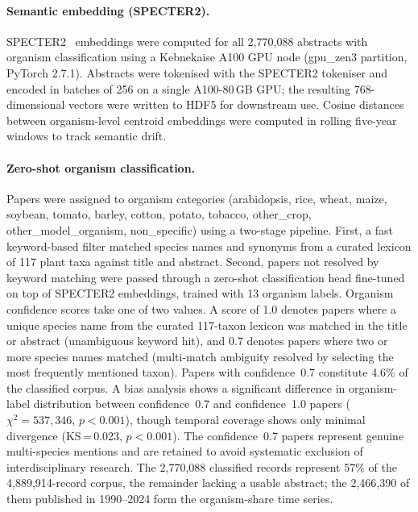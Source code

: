 \paragraph{Semantic embedding (SPECTER2).}
SPECTER2~\cite{singh2023specter2} embeddings were computed for all 2,770,088
abstracts with organism classification using a Kebnekaise A100 GPU node
(gpu\_zen3 partition, PyTorch 2.7.1).
Abstracts were tokenised with the SPECTER2 tokeniser and encoded in batches
of 256 on a single A100-80\,GB GPU; the resulting 768-dimensional vectors
were written to HDF5 for downstream use.
Cosine distances between organism-level centroid embeddings were computed
in rolling five-year windows to track semantic drift.

\paragraph{Zero-shot organism classification.}
Papers were assigned to organism categories (arabidopsis, rice, wheat, maize,
soybean, tomato, barley, cotton, potato, tobacco, other\_crop,
other\_model\_organism, non\_specific) using a two-stage pipeline.
First, a fast keyword-based filter matched species names and synonyms from a
curated lexicon of 117 plant taxa against title and abstract.
Second, papers not resolved by keyword matching were passed through a
zero-shot classification head fine-tuned on top of SPECTER2 embeddings,
trained with 13 organism labels.
Organism confidence scores take one of two values. A score of 1.0 denotes papers where
a unique species name from the curated 117-taxon lexicon was matched in
the title or abstract (unambiguous keyword hit), and 0.7 denotes papers where
two or more species names matched (multi-match ambiguity resolved by
selecting the most frequently mentioned taxon).
Papers with confidence~0.7 constitute 4.6\% of the classified corpus.
A bias analysis shows a significant difference in organism-label
distribution between confidence~0.7 and confidence~1.0 papers
($\chi^2 = 537{,}346$, $p < 0.001$), though temporal coverage shows only
minimal divergence (KS\,=\,0.023, $p < 0.001$).
The confidence~0.7 papers represent genuine multi-species mentions and
are retained to avoid systematic exclusion of interdisciplinary research.
The 2,770,088 classified records represent 57\% of the 4,889,914-record corpus,
the remainder lacking a usable abstract; the 2,466,390 of them published in
1990--2024 form the organism-share time series.

